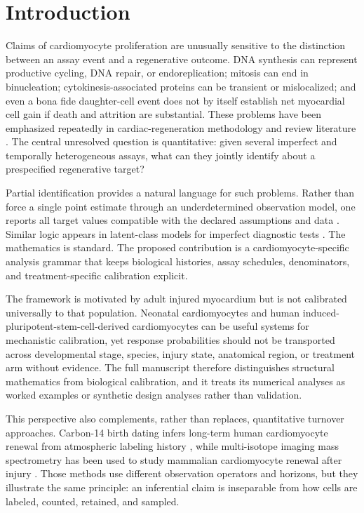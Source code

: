 \documentclass[11pt]{article}
\begin{document}
\section{Introduction}
Claims of cardiomyocyte proliferation are unusually sensitive to the distinction between an assay event and a regenerative outcome. DNA synthesis can represent productive cycling, DNA repair, or endoreplication; mitosis can end in binucleation; cytokinesis-associated proteins can be transient or mislocalized; and even a bona fide daughter-cell event does not by itself establish net myocardial cell gain if death and attrition are substantial. These problems have been emphasized repeatedly in cardiac-regeneration methodology and review literature \citep{Leone2015,Auchampach2022,Gan2020,Kirillova2021}. The central unresolved question is quantitative: given several imperfect and temporally heterogeneous assays, what can they jointly identify about a prespecified regenerative target?

Partial identification provides a natural language for such problems. Rather than force a single point estimate through an underdetermined observation model, one reports all target values compatible with the declared assumptions and data \citep{Manski2003,ImbensManski2004}. Similar logic appears in latent-class models for imperfect diagnostic tests \citep{Collins2014}. The mathematics is standard. The proposed contribution is a cardiomyocyte-specific analysis grammar that keeps biological histories, assay schedules, denominators, and treatment-specific calibration explicit.

The framework is motivated by adult injured myocardium but is not calibrated universally to that population. Neonatal cardiomyocytes and human induced-pluripotent-stem-cell-derived cardiomyocytes can be useful systems for mechanistic calibration, yet response probabilities should not be transported across developmental stage, species, injury state, anatomical region, or treatment arm without evidence. The full manuscript therefore distinguishes structural mathematics from biological calibration, and it treats its numerical analyses as worked examples or synthetic design analyses rather than validation.

This perspective also complements, rather than replaces, quantitative turnover approaches. Carbon-14 birth dating infers long-term human cardiomyocyte renewal from atmospheric labeling history \citep{Bergmann2009}, while multi-isotope imaging mass spectrometry has been used to study mammalian cardiomyocyte renewal after injury \citep{Senyo2013}. Those methods use different observation operators and horizons, but they illustrate the same principle: an inferential claim is inseparable from how cells are labeled, counted, retained, and sampled.
\end{document}
